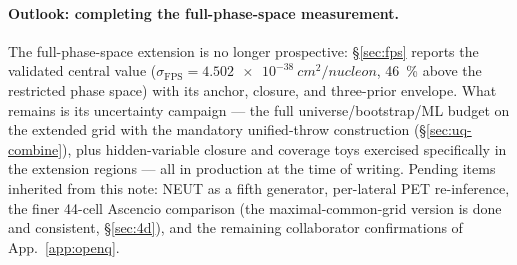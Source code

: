 \paragraph{Outlook: completing the full-phase-space measurement.}
The full-phase-space extension is no longer prospective: \S\ref{sec:fps}
reports the validated central value
($\sigma_{\mathrm{FPS}}=\SI{4.502e-38}{cm^2/nucleon}$, \SI{46}{\percent}
above the restricted phase space) with its anchor, closure, and three-prior
envelope. What remains is its uncertainty campaign --- the full
universe/bootstrap/ML budget on the extended grid with the mandatory
unified-throw construction (\S\ref{sec:uq-combine}), plus hidden-variable
closure and coverage toys exercised specifically in the extension regions
--- all in production at the time of writing. Pending items inherited from
this note: NEUT as a fifth generator, per-lateral PET re-inference, the
finer 44-cell Ascencio comparison (the maximal-common-grid version is done
and consistent, \S\ref{sec:4d}), and the remaining collaborator confirmations
of App.~\ref{app:openq}.
